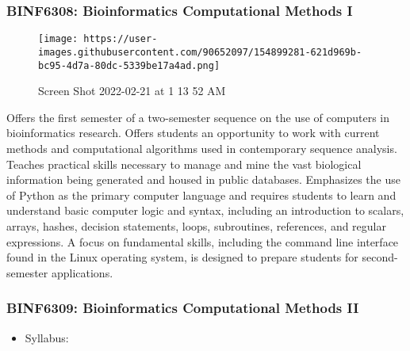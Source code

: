 \documentclass[
  letterpaper,
  DIV=11,
  numbers=noendperiod]{scrreprt}
\providecommand{\tightlist}{%
  \setlength{\itemsep}{0pt}\setlength{\parskip}{0pt}}\usepackage{longtable,booktabs,array}
\begin{document}
\hypertarget{binf6308-bioinformatics-computational-methods-i}{%
\subsubsection*{\texorpdfstring{\textbf{BINF6308: Bioinformatics
Computational Methods
I}}{BINF6308: Bioinformatics Computational Methods I}}\label{binf6308-bioinformatics-computational-methods-i}}

\begin{figure}

{\centering \texttt{[image: https://user-images.githubusercontent.com/90652097/154899281-621d969b-bc95-4d7a-80dc-5339be17a4ad.png]}

}

\caption{Screen Shot 2022-02-21 at 1 13 52 AM}

\end{figure}

Offers the first semester of a two-semester sequence on the use of
computers in bioinformatics research. Offers students an opportunity to
work with current methods and computational algorithms used in
contemporary sequence analysis. Teaches practical skills necessary to
manage and mine the vast biological information being generated and
housed in public databases. Emphasizes the use of Python as the primary
computer language and requires students to learn and understand basic
computer logic and syntax, including an introduction to scalars, arrays,
hashes, decision statements, loops, subroutines, references, and regular
expressions. A focus on fundamental skills, including the command line
interface found in the Linux operating system, is designed to prepare
students for second-semester applications.

\hypertarget{binf6309-bioinformatics-computational-methods-ii}{%
\subsubsection*{\texorpdfstring{\textbf{BINF6309: Bioinformatics
Computational Methods
II}}{BINF6309: Bioinformatics Computational Methods II}}\label{binf6309-bioinformatics-computational-methods-ii}}

\begin{itemize}
\tightlist
\item
  Syllabus:
\end{itemize}
\end{document}
